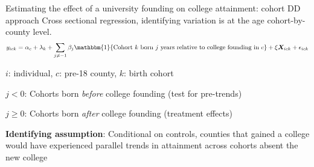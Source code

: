 \documentclass[notes,11pt, aspectratio=169]{beamer}
\newenvironment{wideitemize}{\itemize\addtolength{\itemsep}{10pt}}{\enditemize}
\begin{document}
\begin{frame}{Estimating the effect of a university founding on college attainment: cohort DD approach}
  Cross sectional regression, identifying variation is at the age cohort-by-county level.
  \begin{equation}
    y_{ick} = \alpha_c + \lambda_k + \sum_{j \neq -1} \beta_j \mathbbm{1}\{\text{Cohort } k \text{ born } j \text{ years relative to college founding in } c\} + \xi \bm{X}_{ick} + \epsilon_{ick}
  \end{equation}
  \begin{wideitemize}
    \item $i$: individual, $c$: pre-18 county, $k$: birth cohort
    \item $j < 0$: Cohorts born \textit{before} college founding (test for pre-trends)
    \item $j \geq 0$: Cohorts born \textit{after} college founding (treatment effects)
    \item \textbf{Identifying assumption}: Conditional on controls, counties that gained a college would have experienced parallel trends in attainment across cohorts absent the new college
  \end{wideitemize}
\end{frame}
\end{document}
